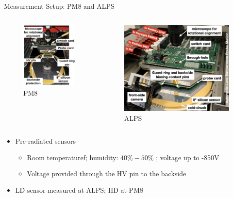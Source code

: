 \documentclass{beamer}
\begin{document}
\begin{frame}{Measurement Setup: PM8 and ALPS}
  \begin{columns}[b]
      \begin{figure}
          \includegraphics[width=.65\textwidth]{plots/PM8_description.png}
          \caption{PM8}
      \end{figure}
      \begin{figure}
          \includegraphics[width=.65\textwidth]{plots/ALPS_setup.png}
          \caption{ALPS}
      \end{figure}
  \end{columns}
    \begin{itemize}
        \small
        \item \alert{Pre-radiated} sensors
            \begin{itemize}
                \scriptsize
                \item  Room temperaturef; humidity: $ 40\% - 50\%$ ;  voltage up to \alert{-850V}
                \item Voltage provided through the HV pin to the backside
            \end{itemize}
        \item LD sensor measured at ALPS; HD at PM8
    \end{itemize}
\end{frame}
\end{document}
